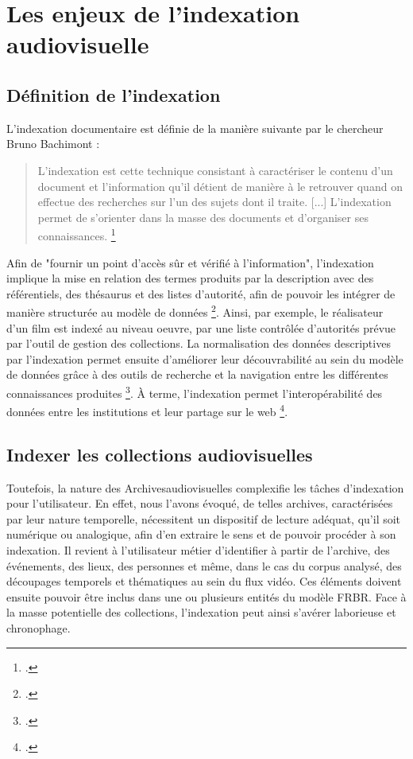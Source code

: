 \section{\label{I_3_A}Les enjeux de l'indexation audiovisuelle} 

\subsection{Définition de l'indexation}

L’indexation documentaire est définie de la manière suivante par le chercheur Bruno Bachimont :  

\begin{quote} 
	
	L'indexation est cette technique consistant à caractériser le contenu d'un document et l'information qu'il détient de manière à le retrouver quand on effectue des recherches sur l'un des sujets dont il traite. [...] L'indexation permet de s'orienter dans la masse des documents et d'organiser ses connaissances. \footcite{zotero-item-582} 
	
\end{quote} 

Afin de "fournir un point d'accès sûr et vérifié à l'information", l'indexation implique la mise en relation des termes produits par la description avec des référentiels, des thésaurus et des listes d'autorité, afin de pouvoir les intégrer de manière structurée au modèle de données \footcite{zotero-item-675}. Ainsi, par exemple, le réalisateur d’un film est indexé au niveau \gls{oeuvre}, par une liste contrôlée d’autorités prévue par l’outil de gestion des collections.  
La normalisation des données descriptives par l'indexation permet ensuite d'améliorer leur découvrabilité au sein du modèle de données grâce à des outils de recherche et la navigation entre les différentes connaissances produites \footcite{zotero-item-675}. À terme, l'indexation permet l’interopérabilité des données entre les institutions et leur partage sur le web \footcite{zotero-item-675}.

\subsection{Indexer les collections audiovisuelles}

Toutefois, la nature des \gls{Archivesaudiovisuelles} complexifie les tâches d'indexation pour l’utilisateur. En effet, nous l’avons évoqué, de telles archives, caractérisées par leur nature temporelle, nécessitent un dispositif de lecture adéquat, qu'il soit numérique ou analogique, afin d'en extraire le sens et de pouvoir procéder à son indexation. Il revient à l'utilisateur métier d’identifier à partir de l’archive, des événements, des lieux, des personnes et même, dans le cas du corpus analysé, des découpages temporels et thématiques au sein du flux vidéo. Ces éléments doivent ensuite pouvoir être inclus dans une ou plusieurs entités du modèle \gls{FRBR}.  Face à la masse potentielle des collections, l’indexation peut ainsi s’avérer laborieuse et chronophage.

